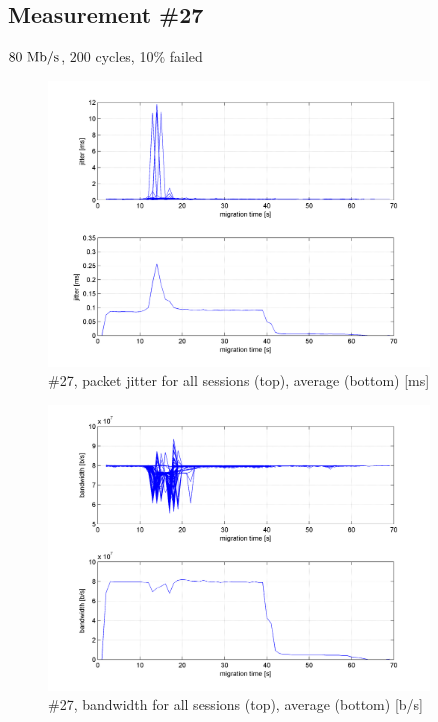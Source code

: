 \subsection{Measurement \#27}
$80~\mathrm{Mb/s}$, $200$ cycles, 10\% failed
\begin{figure}[hp]
	\begin{center}
	\includegraphics[width=0.9\textwidth]{results-274-all.png}
	\end{center}
	\caption[]{\#27, packet jitter for all sessions (top), average (bottom) [ms]}
	\label{img:results-274-all.png}
\end{figure}
\begin{figure}[hp]
	\begin{center}
	\includegraphics[width=0.9\textwidth]{results-279-all.png}
	\end{center}
	\caption[]{\#27, bandwidth for all sessions (top), average (bottom) [b/s]}
	\label{img:results-279-all.png}
\end{figure}
